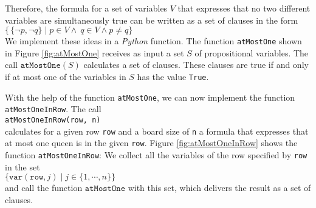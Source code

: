 \noindent
Therefore, the formula for a set of variables $V$ that expresses that no two different
variables are simultaneously true can be written as a set of clauses in the form
\\[0.2cm]
\hspace*{1.3cm}
$\bigl\{\, \{ \neg p, \neg q \} \;|\; p \in V \wedge\ q \in V \wedge p \neq q \bigr\}$
\\[0.2cm]
We implement these ideas in a \textsl{Python} function. The function \texttt{atMostOne} shown in Figure
\ref{fig:atMostOne} receives as input a set $S$ of propositional variables. The call $\texttt{atMostOne}(S)$
calculates a set of clauses. These clauses are true if and only if at most one of the variables in $S$
has the value \texttt{True}.

With the help of the function \texttt{atMostOne}, we can now implement the function
\texttt{atMostOneInRow}. The call \\[0.2cm]
\hspace*{1.3cm} 
\texttt{atMostOneInRow(row, n)} \\[0.2cm]
calculates for a given row \texttt{row} and a board size of \texttt{n} a formula
that expresses that at most one queen is in the given \texttt{row}.
Figure \ref{fig:atMostOneInRow} shows the
function \texttt{atMostOneInRow}: We collect all the variables of the row specified by \texttt{row}
in the set 
\\[0.2cm]
\hspace*{1.3cm}
$\bigl\{ \texttt{var}(\texttt{row},j) \mid j \in \{1, \cdots, n \} \bigr\}$
\\[0.2cm]
and call the function $\texttt{atMostOne}$ with this set, which delivers the result
as a set of clauses.

